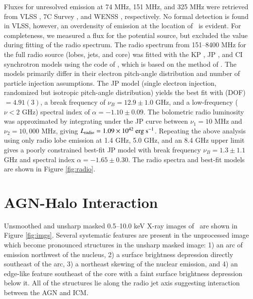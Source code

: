 \documentclass[referee,traditabstract]{aa}
\begin{document}
Fluxes for unresolved emission at 74 MHz, 151 MHz, and 325 MHz were
retrieved from VLSS \citep{vlss}, 7C Survey
\citep{1999MNRAS.306...31R}, and WENSS \citep{1997A&AS..124..259R},
respectively. No formal detection is found in VLSS, however, an
overdensity of emission at the location of \irs\ is evident. For
completeness, we measured a flux for the potential source, but
excluded the value during fitting of the radio spectrum. The radio
spectrum from 151--8400 MHz for the full radio source (lobes, jets,
and core) was fitted with the KP \citep{1962SvA.....6..317K, pach}, JP
\citep{1973A&A....26..423J}, and CI \citep{1987MNRAS.225..335H}
synchrotron models using the code of \citet{2005ApJ...624..656W},
which is based on the method of \citet{1991ApJ...383..554C}. The
models primarily differ in their electron pitch-angle distribution and
number of particle injection assumptions. The JP model (single
electron injection, randomized but isotropic pitch-angle distribution)
yields the best fit with \chisq(DOF)$ = 4.91(3)$, a break frequency of
$\nu_B = 12.9 \pm 1.0$ GHz, and a low-frequency ($\nu < 2$ GHz)
spectral index of $\alpha = -1.10 \pm 0.09$. The bolometric radio
luminosity was approximated by integrating under the JP curve between
$\nu_1 = 10$ MHz and $\nu_2 = 10,000$ MHz, giving $L_{\rm{radio}} = 1.09 \times
10^{42}~\rm{\mbox{\ensuremath{\rm{erg}}}~\ensuremath{\rm{\mbox{\ensuremath{\rm{s}}}^{-1}}}}$. Repeating the above analysis using only radio lobe
emission at 1.4 GHz, 5.0 GHz, and an 8.4 GHz upper limit gives a
poorly constrained best-fit JP model with break frequency $\nu_B = 1.3
\pm 1.1$ GHz and spectral index $\alpha = -1.65 \pm 0.30$. The radio
spectra and best-fit models are shown in Figure \ref{fig:radio}.

\section{AGN-Halo Interaction}
\label{sec:sub}

Unsmoothed and unsharp masked 0.5--10.0 keV X-ray images of \irs\ are
shown in Figure \ref{fig:imgs}. Several systematic features are
present in the unprocessed image which become pronounced structures in
the unsharp masked image: 1) an arc of emission northwest of the
nucleus, 2) a surface brightness depression directly southeast of the
arc, 3) a northeast skewing of the nuclear emission, and 4) an
edge-like feature southeast of the core with a faint surface
brightness depression below it. All of the structures lie along the
radio jet axis suggesting interaction between the AGN and ICM.
\end{document}
